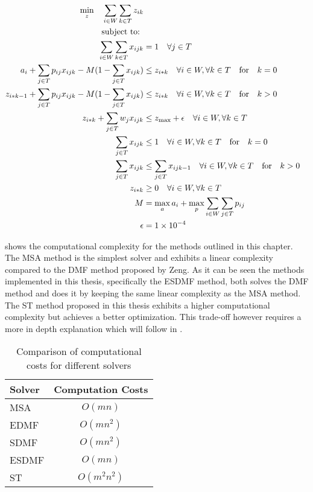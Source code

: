 \documentclass{seal_thesis}
\begin{document}
\begin{align}
    \min_z \quad \sum_{i \in W} \sum_{k \in T} z_{ik}\\
    \text{subject to: } \notag \\
    \sum_{i \in W} \sum_{k \in T} x_{ijk} &= 1 \quad \forall j \in T\\
    a_i + \sum_{j \in T} p_{ij} x_{ijk} - M(1 - \sum_{j \in T} x_{ijk}) &\leq z_{i*k} \quad \forall i \in W, \forall k \in T \quad \text{for} \quad k=0\\
    z_{i*k-1} + \sum_{j \in T} p_{ij} x_{ijk} - M(1 - \sum_{j \in T} x_{ijk}) &\leq z_{i*k} \quad \forall i \in W, \forall k \in T \quad \text{for} \quad k>0\\
    z_{i*k}+ \sum_{j \in T} w_j x_{ijk} &\leq z_{\text{max}} + \epsilon \quad \forall i \in W, \forall k \in T\\
    \sum_{j \in T} x_{ijk} &\leq 1 \quad \forall i \in W, \forall k \in T \quad \text{for} \quad k=0\\
    \sum_{j \in T} x_{ijk} &\leq \sum_{j \in T} x_{ijk-1} \quad \forall i \in W, \forall k \in T \quad \text{for} \quad k>0\\
    z_{i*k} &\geq 0 \quad \forall i \in W, \forall k \in T\\
    M &= \max_a a_i + \max_p \sum_{i \in W} \sum_{j \in T} p_{ij}\\
    \epsilon &= \num{1e-4}
\end{align}

 shows the computational complexity for the methods outlined in this chapter. The MSA method is the simplest solver and exhibits a linear complexity compared to the DMF method proposed by Zeng. As it can be seen the methods implemented in this thesis, specifically the ESDMF method, both solves the DMF method and does it by keeping the same linear complexity as the MSA method. The ST method proposed in this thesis exhibits a higher computational complexity but achieves a better optimization. This trade-off however requires a more in depth explanation which will follow in .

\begin{table}[htb]
\centering
\begin{tabular}{@{}lc@{}}
\toprule
Solver & Computation Costs \\ \midrule
MSA    & $O(mn)$           \\
EDMF   & $O(mn^2)$         \\
SDMF   & $O(mn^2)$         \\
ESDMF  & $O(mn)$           \\
ST 	   & $O(m^2n^2)$ \\	\bottomrule
\end{tabular}
\caption{Comparison of computational costs for different solvers}
\label{tab:big_oh_solvers}
\end{table}
\end{document}
